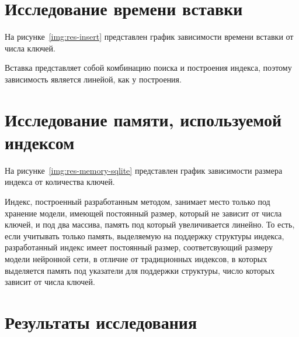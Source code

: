 \section{Исследование времени вставки}

На рисунке~\ref{img:res-insert} представлен график зависимости времени вставки
от числа ключей.


Вставка представляет собой комбинацию поиска и построения индекса, поэтому
зависимость является линейой, как у построения.

\section{Исследование памяти, используемой индексом}

%

На рисунке~\ref{img:res-memory-sqlite} представлен график зависимости размера индекса
от количества ключей.


Индекс, построенный разработанным методом, занимает место только под хранение
модели, имеющей постоянный размер, который не зависит от числа ключей, и под два
массива, память под который увеличивается линейно. То есть, если учитывать
только память, выделяемую на поддержку структуры индекса, разработанный индекс
имеет постоянный размер, соответсвующий размеру модели нейронной сети, в отличие
от традиционных индексов, в которых выделяется память под указатели для
поддержки структуры, число которых зависит от числа ключей. 

\section{Результаты исследования}

